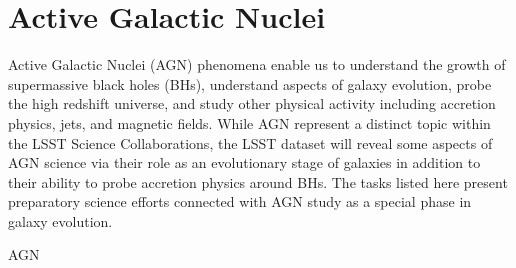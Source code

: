 \section{Active Galactic Nuclei}\label{sec:tasks:agn:intro} {\justify


Active Galactic Nuclei (AGN) phenomena enable us to understand the growth of supermassive black holes (BHs), understand aspects of galaxy evolution, probe the high redshift universe, and study other physical activity including accretion physics, jets, and magnetic fields.  
While AGN represent a distinct topic within the LSST Science Collaborations, the LSST
dataset will reveal some aspects of AGN science via their role as an
evolutionary stage of galaxies in addition to their ability to probe accretion physics around BHs.
The tasks listed here present preparatory science efforts connected with AGN study as a special
phase in galaxy evolution.


\begin{tasklist}{AGN}

\end{tasklist}}
